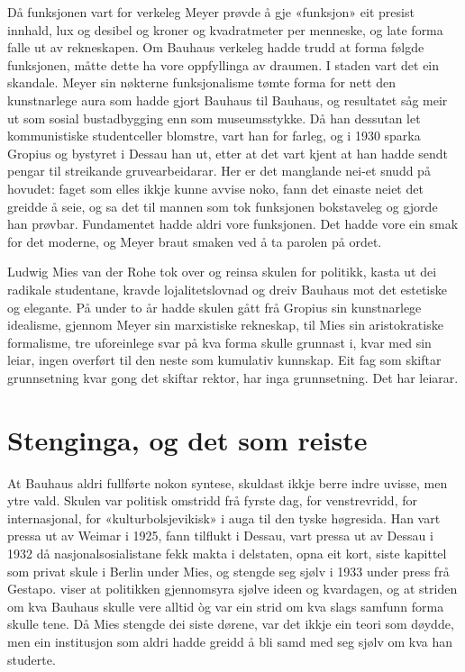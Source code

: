 \begin{kasus}{Då funksjonen vart for verkeleg}
Meyer prøvde å gje «funksjon» eit presist innhald, lux og desibel og kroner og kvadratmeter per menneske, og late forma falle ut av rekneskapen. Om Bauhaus verkeleg hadde trudd at forma følgde funksjonen, måtte dette ha vore oppfyllinga av draumen. I staden vart det ein skandale. Meyer sin nøkterne funksjonalisme tømte forma for nett den kunstnarlege aura som hadde gjort Bauhaus til Bauhaus, og resultatet såg meir ut som sosial bustadbygging enn som museumsstykke. Då han dessutan let kommunistiske studentceller blomstre, vart han for farleg, og i 1930 sparka Gropius og bystyret i Dessau han ut, etter at det vart kjent at han hadde sendt pengar til streikande gruvearbeidarar. Her er det manglande nei-et snudd på hovudet: faget som elles ikkje kunne avvise noko, fann det einaste neiet det greidde å seie, og sa det til mannen som tok funksjonen bokstaveleg og gjorde han prøvbar. Fundamentet hadde aldri vore funksjonen. Det hadde vore ein smak for det moderne, og Meyer braut smaken ved å ta parolen på ordet.
\end{kasus}

Ludwig Mies van der Rohe tok over og reinsa skulen for politikk, kasta ut dei radikale studentane, kravde lojalitetslovnad og dreiv Bauhaus mot det estetiske og elegante. På under to år hadde skulen gått frå Gropius sin kunstnarlege idealisme, gjennom Meyer sin marxistiske rekneskap, til Mies sin aristokratiske formalisme, tre uforeinlege svar på kva forma skulle grunnast i, kvar med sin leiar, ingen overført til den neste som kumulativ kunnskap. Eit fag som skiftar grunnsetning kvar gong det skiftar rektor, har inga grunnsetning. Det har leiarar.

\section{Stenginga, og det som reiste}

At Bauhaus aldri fullførte nokon syntese, skuldast ikkje berre indre uvisse, men ytre vald. Skulen var politisk omstridd frå fyrste dag, for venstrevridd, for internasjonal, for «kulturbolsjevikisk» i auga til den tyske høgresida. Han vart pressa ut av Weimar i 1925, fann tilflukt i Dessau, vart pressa ut av Dessau i 1932 då nasjonalsosialistane fekk makta i delstaten, opna eit kort, siste kapittel som privat skule i Berlin under Mies, og stengde seg sjølv i 1933 under press frå Gestapo. \textcite{forgacs1995bauhaus} viser at politikken gjennomsyra sjølve ideen og kvardagen, og at striden om kva Bauhaus skulle vere alltid òg var ein strid om kva slags samfunn forma skulle tene. Då Mies stengde dei siste dørene, var det ikkje ein teori som døydde, men ein institusjon som aldri hadde greidd å bli samd med seg sjølv om kva han studerte.

